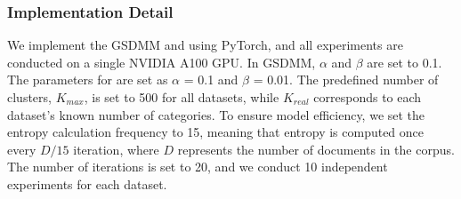
\subsubsection{Implementation Detail}
We implement the GSDMM and \sysname{} using PyTorch, and all experiments are conducted on a single NVIDIA A100 GPU. In GSDMM, $\alpha$ and $\beta$ are set to 0.1. The parameters for \sysname{} are set as $\alpha$ = 0.1 and $\beta$ = 0.01. The predefined number of clusters, $K_{max}$, is set to 500 for all datasets, while $K_{real}$ corresponds to each dataset's known number of categories. To ensure model efficiency, we set the entropy calculation frequency to 15, meaning that entropy is computed once every $D/15$ iteration, where $D$ represents the number of documents in the corpus. The number of iterations is set to 20, and we conduct 10 independent experiments for each dataset.

